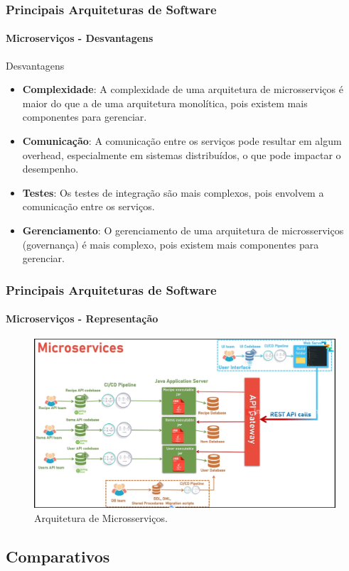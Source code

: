 \documentclass[
	10pt, %
	t, %
]{beamer}
\begin{document}
\begin{frame}
	\frametitle{Principais Arquiteturas de Software}
	\framesubtitle{Microserviços - Desvantagens}

	\begin{alertblock}{Desvantagens}
		\begin{itemize}
			\item \textbf{Complexidade}: A complexidade de uma arquitetura de microsserviços é maior do que a de uma arquitetura monolítica, pois existem mais componentes para gerenciar.
			\item \textbf{Comunicação}: A comunicação entre os serviços pode resultar em algum overhead, especialmente em sistemas distribuídos, o que pode impactar o desempenho.
			\item \textbf{Testes}: Os testes de integração são mais complexos, pois envolvem a comunicação entre os serviços.
			\item \textbf{Gerenciamento}: O gerenciamento de uma arquitetura de microsserviços (governança) é mais complexo, pois existem mais componentes para gerenciar.
		\end{itemize}
	\end{alertblock}

\end{frame}

\begin{frame}
	\frametitle{Principais Arquiteturas de Software}
	\framesubtitle{Microserviços - Representação}
	
	\begin{figure}
		\centering
		\includegraphics[width=0.9\linewidth]{Images/microservice.png}
		\caption{Arquitetura de Microsserviços.}\label{fig:microservices}
	\end{figure}

\end{frame}

\subsection{Comparativos}
\end{document}
